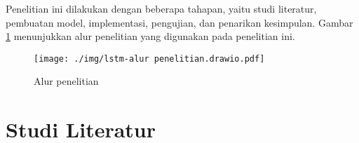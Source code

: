 



Penelitian ini dilakukan dengan beberapa tahapan, yaitu studi literatur, pembuatan model, implementasi, pengujian, dan penarikan kesimpulan. Gambar \ref{fig:alur-penelitian} menunjukkan alur penelitian yang digunakan pada penelitian ini.

\begin{figure}[tph]
	\centering
	\texttt{[image: ./img/lstm-alur penelitian.drawio.pdf]}
	\caption{Alur penelitian}
	\label{fig:alur-penelitian}
\end{figure}

\section{Studi Literatur}
\label{subsec: metodologi-studi-literatur}

